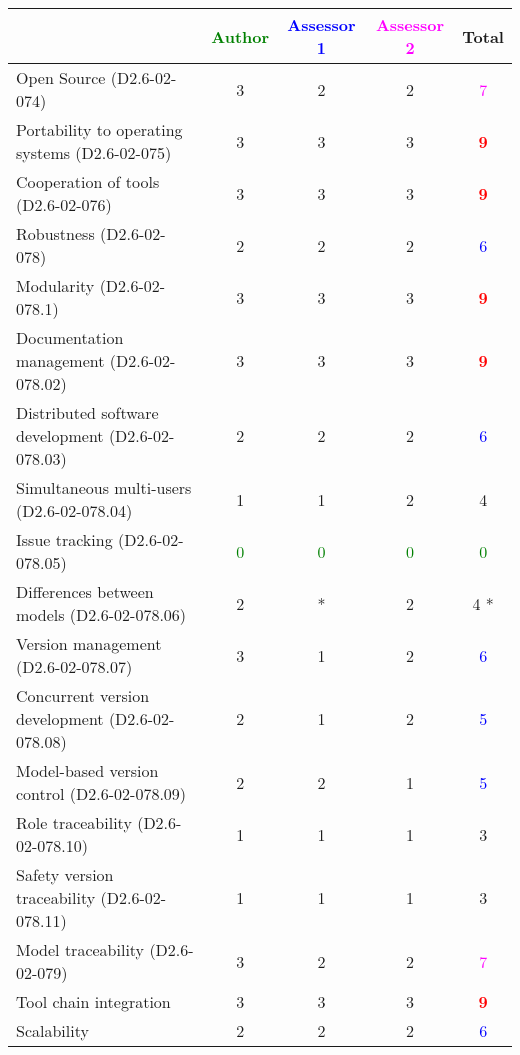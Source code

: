 \begin{tabular}{|l | c | c | c | c|}
\hline
& \textcolor{green}{Author} & \textcolor{blue}{Assessor 1} & \textcolor{magenta}{Assessor 2} & Total \\
\hline 
Open Source (D2.6-02-074) & 3     & 2     & 2     & \textcolor{magenta}{7} \\
\hline 
Portability to operating systems (D2.6-02-075) & 3     & 3     & 3     & \textcolor{red}{\textbf{9}} \\
\hline
Cooperation of tools (D2.6-02-076) & 3     & 3     & 3     & \textcolor{red}{\textbf{9}} \\
\hline
Robustness (D2.6-02-078) & 2     & 2     & 2     & \textcolor{blue}{6} \\
\hline
Modularity (D2.6-02-078.1) & 3     & 3     & 3     & \textcolor{red}{\textbf{9}} \\
\hline
Documentation management (D2.6-02-078.02) & 3     & 3     & 3     & \textcolor{red}{\textbf{9}} \\
\hline
Distributed software development (D2.6-02-078.03)  & 2     & 2     & 2     & \textcolor{blue}{6} \\
\hline
Simultaneous multi-users (D2.6-02-078.04)   & 1     & 1     & 2     & 4     \\
\hline
Issue tracking (D2.6-02-078.05) & \textcolor{green}{0} & \textcolor{green}{0} & \textcolor{green}{0} & \textcolor{green}{0} \\
\hline
Differences between models (D2.6-02-078.06) & 2     & * & 2     & 4    * \\
\hline
Version management (D2.6-02-078.07) & 3     & 1     & 2     & \textcolor{blue}{6} \\
\hline
Concurrent version development (D2.6-02-078.08) & 2     & 1     & 2     & \textcolor{blue}{5} \\
\hline
Model-based version control (D2.6-02-078.09) & 2     & 2     & 1     & \textcolor{blue}{5} \\
\hline
Role traceability (D2.6-02-078.10) & 1     & 1     & 1     & 3     \\
\hline
Safety version traceability (D2.6-02-078.11) & 1     & 1     & 1     & 3     \\
\hline
Model traceability (D2.6-02-079) & 3     & 2     & 2     & \textcolor{magenta}{7} \\
\hline
Tool chain integration & 3     & 3     & 3     & \textcolor{red}{\textbf{9}} \\
\hline
Scalability & 2     & 2     & 2     & \textcolor{blue}{6} \\
\hline
\end{tabular}

